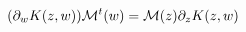 \begin{equation}
(\partial_w K(z,w)) {\cal M}^t(w) = {\cal M}(z) \partial_z K(z,w)
\label{int}
\end{equation}


